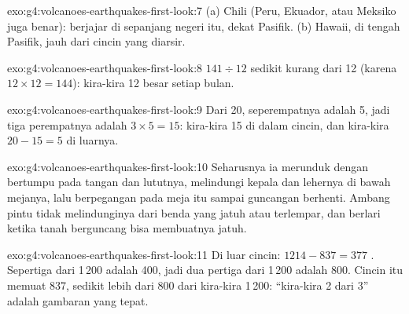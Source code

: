 \begin{solution}{exo:g4:volcanoes-earthquakes-first-look:7}
(a) Chili (Peru, Ekuador, atau Meksiko juga benar): 
berjajar di sepanjang negeri itu, dekat  Pasifik. (b) Hawaii, di
tengah  Pasifik, jauh dari cincin yang diarsir.
\end{solution}

\begin{solution}{exo:g4:volcanoes-earthquakes-first-look:8}
$141 \div 12$ sedikit kurang dari 12 (karena $12 \times 12 = 144$): kira-kira
12  besar setiap bulan.
\end{solution}

\begin{solution}{exo:g4:volcanoes-earthquakes-first-look:9}
Dari 20, seperempatnya adalah 5, jadi tiga perempatnya adalah $3 \times 5 = 15$:
kira-kira 15 di dalam cincin, dan kira-kira $20 - 15 = 5$ di luarnya.
\end{solution}

\begin{solution}{exo:g4:volcanoes-earthquakes-first-look:10}
Seharusnya ia merunduk dengan bertumpu pada tangan dan lututnya, melindungi
kepala dan lehernya di bawah mejanya, lalu berpegangan pada meja itu sampai
guncangan berhenti. Ambang pintu tidak melindunginya dari benda yang jatuh
atau terlempar, dan berlari ketika tanah berguncang bisa membuatnya jatuh.
\end{solution}

\begin{solution}{exo:g4:volcanoes-earthquakes-first-look:11}
Di luar cincin: $1214 - 837 = 377$ . Sepertiga dari 1\,200 adalah
400, jadi dua pertiga dari 1\,200 adalah 800. Cincin itu memuat 837, sedikit
lebih dari 800 dari kira-kira 1\,200: ``kira-kira 2 dari 3'' adalah gambaran
yang tepat.
\end{solution}
